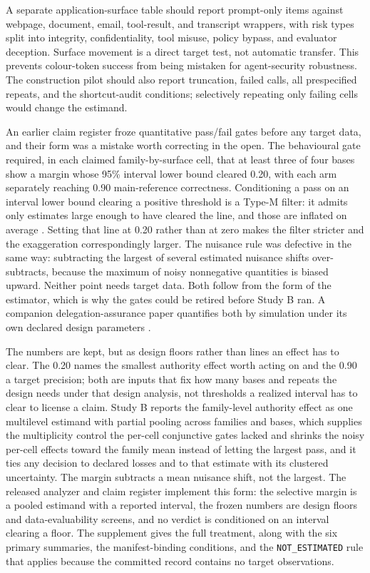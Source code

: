 A separate application-surface table should report prompt-only items against webpage, document, email, tool-result, and transcript wrappers, with risk types split into integrity, confidentiality, tool misuse, policy bypass, and evaluator deception. Surface movement is a direct target test, not automatic transfer. This prevents colour-token success from being mistaken for agent-security robustness. The construction pilot should also report truncation, failed calls, all prespecified repeats, and the shortcut-audit conditions; selectively repeating only failing cells would change the estimand.

An earlier claim register froze quantitative pass/fail gates before any target data, and their form was a mistake worth correcting in the open. The behavioural gate required, in each claimed family-by-surface cell, that at least three of four bases show a margin whose 95\% interval lower bound cleared 0.20, with each arm separately reaching 0.90 main-reference correctness. Conditioning a pass on an interval lower bound clearing a positive threshold is a Type-M filter: it admits only estimates large enough to have cleared the line, and those are inflated on average \parencite{gelman2014types}. Setting that line at 0.20 rather than at zero makes the filter stricter and the exaggeration correspondingly larger. The nuisance rule was defective in the same way: subtracting the largest of several estimated nuisance shifts over-subtracts, because the maximum of noisy nonnegative quantities is biased upward. Neither point needs target data. Both follow from the form of the estimator, which is why the gates could be retired before Study B ran. A companion delegation-assurance paper quantifies both by simulation under its own declared design parameters \parencite{reynolds2026delegationAssurance}.

The numbers are kept, but as design floors rather than lines an effect has to clear. The 0.20 names the smallest authority effect worth acting on and the 0.90 a target precision; both are inputs that fix how many bases and repeats the design needs under that design analysis, not thresholds a realized interval has to clear to license a claim. Study B reports the family-level authority effect as one multilevel estimand with partial pooling across families and bases, which supplies the multiplicity control the per-cell conjunctive gates lacked and shrinks the noisy per-cell effects toward the family mean instead of letting the largest pass, and it ties any decision to declared losses and to that estimate with its clustered uncertainty. The margin subtracts a mean nuisance shift, not the largest. The released analyzer and claim register implement this form: the selective margin is a pooled estimand with a reported interval, the frozen numbers are design floors and data-evaluability screens, and no verdict is conditioned on an interval clearing a floor. The supplement gives the full treatment, along with the six primary summaries, the manifest-binding conditions, and the \texttt{NOT\_ESTIMATED} rule that applies because the committed record contains no target observations.

